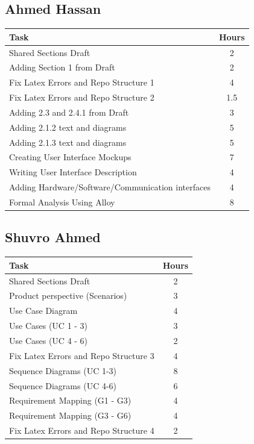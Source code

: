 \subsection{Ahmed Hassan}

{\centering
\begin{tabular}{@{}p{8cm}c@{}}
	\toprule
	\textbf{Task} & \textbf{Hours} \\
\midrule
Shared Sections Draft & 2 \\
Adding Section 1 from Draft & 2 \\
Fix Latex Errors and Repo Structure 1 & 4 \\
Fix Latex Errors and Repo Structure 2 & 1.5 \\
Adding 2.3 and 2.4.1 from Draft & 3 \\
Adding 2.1.2 text and diagrams & 5 \\
Adding 2.1.3 text and diagrams & 5 \\
Creating User Interface Mockups & 7 \\
Writing User Interface Description & 4 \\
Adding Hardware/Software/Communication interfaces & 4 \\
Formal Analysis Using Alloy & 8\\

\bottomrule
\end{tabular}\par}


\subsection{Shuvro Ahmed}

{\centering
\begin{tabular}{@{}p{8cm}c@{}}
	\toprule
	\textbf{Task} & \textbf{Hours} \\
\midrule
Shared Sections Draft & 2 \\
Product perspective (Scenarios) & 3 \\
Use Case Diagram & 4 \\
Use Cases (UC 1 - 3) & 3 \\
Use Cases (UC 4 - 6) & 2 \\
Fix Latex Errors and Repo Structure 3 & 4 \\
Sequence Diagrams (UC 1-3) & 8 \\
Sequence Diagrams (UC 4-6) & 6 \\
Requirement Mapping (G1 - G3) & 4\\
Requirement Mapping (G3 - G6) & 4\\
Fix Latex Errors and Repo Structure 4 & 2 \\

\bottomrule
\end{tabular}\par}


